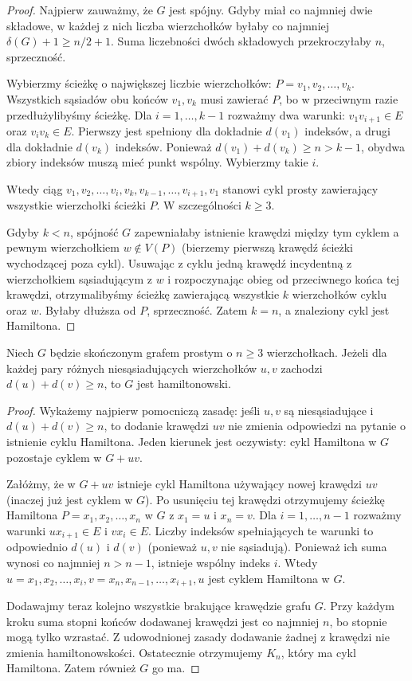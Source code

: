 \begin{proof}
Najpierw zauważmy, że $G$ jest spójny.
Gdyby miał co najmniej dwie składowe, w każdej
z nich liczba wierzchołków byłaby co najmniej
$\delta(G)+1\ge n/2+1$. Suma liczebności dwóch
składowych przekroczyłaby $n$, sprzeczność.

Wybierzmy ścieżkę o największej liczbie wierzchołków:
$P=v_1,v_2,\ldots,v_k$. Wszystkich sąsiadów obu
końców $v_1,v_k$ musi zawierać $P$, bo w przeciwnym
razie przedłużylibyśmy ścieżkę.
Dla $i=1,\ldots,k-1$ rozważmy dwa warunki:
$v_1v_{i+1}\in E$ oraz $v_iv_k\in E$.
Pierwszy jest spełniony dla dokładnie $d(v_1)$ indeksów,
a drugi dla dokładnie $d(v_k)$ indeksów.
Ponieważ $d(v_1)+d(v_k)\ge n>k-1$, obydwa
zbiory indeksów muszą mieć punkt wspólny.
Wybierzmy takie $i$.

Wtedy ciąg
$v_1,v_2,\ldots,v_i,v_k,v_{k-1},\ldots,v_{i+1},v_1$
stanowi cykl prosty zawierający wszystkie wierzchołki
ścieżki $P$. W szczególności $k\ge3$.

Gdyby $k<n$, spójność $G$ zapewniałaby istnienie
krawędzi między tym cyklem a pewnym wierzchołkiem
$w\notin V(P)$ (bierzemy pierwszą krawędź ścieżki
wychodzącej poza cykl). Usuwając z cyklu jedną
krawędź incydentną z wierzchołkiem sąsiadującym
z $w$ i rozpoczynając obieg od przeciwnego końca
tej krawędzi, otrzymalibyśmy ścieżkę zawierającą
wszystkie $k$ wierzchołków cyklu oraz $w$.
Byłaby dłuższa od $P$, sprzeczność.
Zatem $k=n$, a znaleziony cykl jest Hamiltona.
\end{proof}

\begin{twierdzenie}[Ore]
\label{thm:tg-ore}
Niech $G$ będzie skończonym grafem prostym o
$n\ge3$ wierzchołkach. Jeżeli dla każdej pary
różnych niesąsiadujących wierzchołków $u,v$
zachodzi $d(u)+d(v)\ge n$, to $G$ jest hamiltonowski.
\end{twierdzenie}

\begin{proof}
Wykażemy najpierw pomocniczą zasadę: jeśli $u,v$
są niesąsiadujące i $d(u)+d(v)\ge n$, to
dodanie krawędzi $uv$ nie zmienia odpowiedzi
na pytanie o istnienie cyklu Hamiltona.
Jeden kierunek jest oczywisty: cykl Hamiltona
w $G$ pozostaje cyklem w $G+uv$.

Załóżmy, że w $G+uv$ istnieje cykl Hamiltona
używający nowej krawędzi $uv$ (inaczej już jest
cyklem w $G$). Po usunięciu tej krawędzi otrzymujemy
ścieżkę Hamiltona $P=x_1,x_2,\ldots,x_n$ w $G$
z $x_1=u$ i $x_n=v$. Dla $i=1,\ldots,n-1$
rozważmy warunki $ux_{i+1}\in E$ i $vx_i\in E$.
Liczby indeksów spełniających te warunki to
odpowiednio $d(u)$ i $d(v)$ (ponieważ $u,v$
nie sąsiadują). Ponieważ ich suma wynosi co
najmniej $n>n-1$, istnieje wspólny indeks $i$.
Wtedy
$u=x_1,x_2,\ldots,x_i,v=x_n,x_{n-1},\ldots,x_{i+1},u$
jest cyklem Hamiltona w $G$.

Dodawajmy teraz kolejno wszystkie brakujące
krawędzie grafu $G$. Przy każdym kroku suma stopni
końców dodawanej krawędzi jest co najmniej $n$,
bo stopnie mogą tylko wzrastać. Z udowodnionej
zasady dodawanie żadnej z krawędzi nie zmienia
hamiltonowskości. Ostatecznie otrzymujemy $K_n$,
który ma cykl Hamiltona. Zatem również $G$ go ma.
\end{proof}

